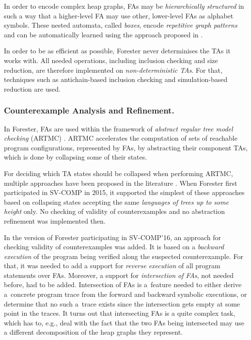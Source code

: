 In order to encode complex heap graphs, FAs may be \emph{hierarchically
structured} in such a way that a higher-level FA may use other, lower-level FAs
as alphabet symbols. These nested automata, called \emph{boxes}, encode
\emph{repetitive graph patterns} and can be automatically learned using the
approach proposed in \cite{cav13}.

In order to be as efficient as possible, Forester never determinises the TAs
it works with. All needed operations, including inclusion checking and size
reduction, are therefore implemented on \emph{non-deterministic TAs}. For that,
techniques such as antichain-based inclusion checking and simulation-based
reduction are used.

\subsubsection{Counterexample Analysis and Refinement.}

In Forester, FAs are used within the framework of \emph{abstract regular tree
model checking} (ARTMC) \cite{sttt12}. ARTMC accelerates the computation of sets
of reachable program configurations, represented by FAs, by abstracting their
component TAs, which is done by collapsing some of their states. 

For deciding which TA states should be collapsed when performing ARTMC, multiple
approaches have been proposed in the literature \cite{sttt12}.  When Forester
first participated in SV-COMP in 2015, it supported the simplest of these
approaches based on collapsing states accepting the same \emph{languages of
trees up to some height} only.
No checking of validity of counterexamples and no abstraction refinement was
implemented then.

In the version of Forester participating in SV-COMP'16, an approach for checking
validity of counterexamples was added. It is based on a \emph{backward
execution} of the program being verified along the suspected counterexample. For
that, it was needed to add a support for \emph{reverse execution} of all program
statements over FAs. Moreover, a support for \emph{intersection of FAs}, not
needed before, had to be added. Intersection of FAs is a~feature needed to
either derive a~concrete program trace from the forward and backward 
symbolic executions, or determine that no such a~trace exists since the
intersection gets empty at some point in the traces.
It turns out that intersecting FAs is a quite complex task, which has to, e.g.,
deal with the fact that the two FAs being intersected may use a different
decomposition of the heap graphs they represent.

